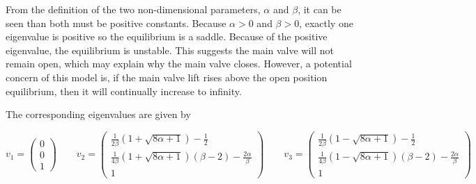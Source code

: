 From the definition of the two non-dimensional parameters, $\alpha$ and $\beta$, it can be seen than both must be positive constants. Because $\alpha > 0$ and $\beta > 0$, exactly one eigenvalue is positive so the equilibrium is a saddle. Because of the positive eigenvalue, the equilibrium is unstable. This suggests the main valve will not remain open, which may explain why the main valve closes. However, a potential concern of this model is, if the main valve lift rises above the open position equilibrium, then it will continually increase to infinity.

The corresponding eigenvalues are given by

\begin{equation*}
    v_1 = \begin{pmatrix}
    0 \\ 0 \\ 1
    \end{pmatrix} \qquad
    v_2 = \begin{pmatrix}
    \frac{1}{2\beta} \left( 1 + \sqrt{8\alpha+1} \right) - \frac{1}{2} \\ \frac{1}{4\beta} \left( 1 + \sqrt{8\alpha+1} \right) \left( \beta - 2 \right) - \frac{2\alpha}{\beta} \\ 1
    \end{pmatrix} \qquad
    v_3 = \begin{pmatrix}
    \frac{1}{2\beta} \left( 1 - \sqrt{8\alpha+1} \right) - \frac{1}{2} \\ \frac{1}{4\beta} \left( 1 - \sqrt{8\alpha+1} \right) \left( \beta - 2 \right) - \frac{2\alpha}{\beta} \\ 1
    \end{pmatrix}
\end{equation*}

\newpage
